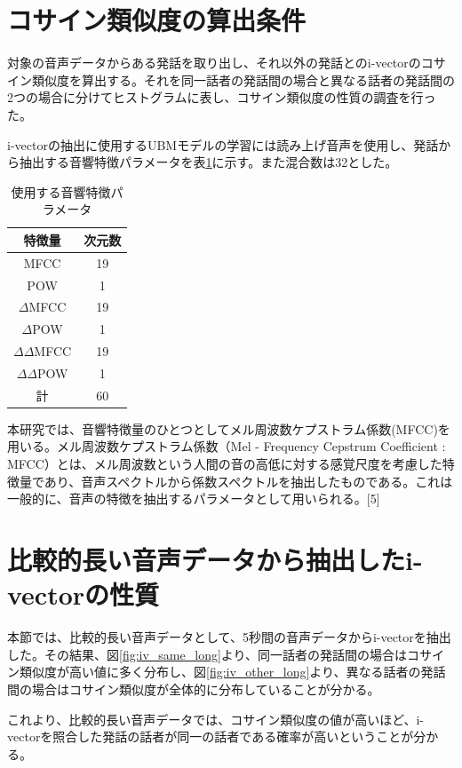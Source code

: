 \section{コサイン類似度の算出条件}
対象の音声データからある発話を取り出し、それ以外の発話とのi-vectorのコサイン類似度を算出する。それを同一話者の発話間の場合と異なる話者の発話間の2つの場合に分けてヒストグラムに表し、コサイン類似度の性質の調査を行った。\par
i-vectorの抽出に使用するUBMモデルの学習には読み上げ音声\cite{ATR}を使用し、発話から抽出する音響特徴パラメータを表\ref{iv_feature}に示す。また混合数は32とした。

\begin{table}[htb]
  \begin{center}
    \caption{使用する音響特徴パラメータ}
    \label{iv_feature}
    \begin{tabular}{|c||c|} \hline
      特徴量 & 次元数\\ \hline
      MFCC & 19  \\ \hline
      POW & 1  \\ \hline
      $\Delta$MFCC & 19 \\ \hline
      $\Delta$POW & 1 \\ \hline
      $\Delta\Delta$MFCC & 19 \\ \hline
      $\Delta\Delta$POW & 1 \\ \hline
      計 & 60 \\ \hline
    \end{tabular}
  \end{center}
\end{table}

本研究では、音響特徴量のひとつとしてメル周波数ケプストラム係数(MFCC)を用いる。メル周波数ケプストラム係数（Mel - Frequency Cepstrum Coefficient : MFCC）とは、メル周波数という人間の音の高低に対する感覚尺度を考慮した特徴量であり、音声スペクトルから係数スペクトルを抽出したものである。これは一般的に、音声の特徴を抽出するパラメータとして用いられる。[5]

\section{比較的長い音声データから抽出したi-vectorの性質}
本節では、比較的長い音声データとして、5秒間の音声データからi-vectorを抽出した。その結果、図\ref{fig:iv_same_long}より、同一話者の発話間の場合はコサイン類似度が高い値に多く分布し、図\ref{fig:iv_other_long}より、異なる話者の発話間の場合はコサイン類似度が全体的に分布していることが分かる。\par
これより、比較的長い音声データでは、コサイン類似度の値が高いほど、i-vectorを照合した発話の話者が同一の話者である確率が高いということが分かる。

